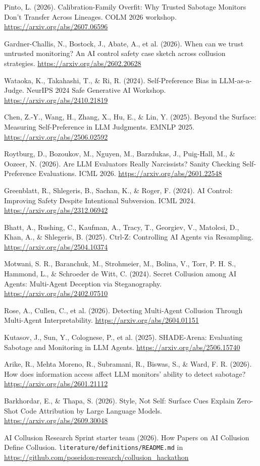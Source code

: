 \documentclass[11pt,letterpaper]{article}
\begin{document}
\begin{enumerate}[label={[\arabic*]},leftmargin=2.2em,itemsep=1pt]
\item Pinto, L. (2026). Calibration-Family Overfit: Why Trusted Sabotage Monitors Don't Transfer Across Lineages. COLM 2026 workshop. \url{https://arxiv.org/abs/2607.06596}
\item Gardner-Challis, N., Bostock, J., Abate, A., et al. (2026). When can we trust untrusted monitoring? An AI control safety case sketch across collusion strategies. \url{https://arxiv.org/abs/2602.20628}
\item Wataoka, K., Takahashi, T., \& Ri, R. (2024). Self-Preference Bias in LLM-as-a-Judge. NeurIPS 2024 Safe Generative AI Workshop. \url{https://arxiv.org/abs/2410.21819}
\item Chen, Z.-Y., Wang, H., Zhang, X., Hu, E., \& Lin, Y. (2025). Beyond the Surface: Measuring Self-Preference in LLM Judgments. EMNLP 2025. \url{https://arxiv.org/abs/2506.02592}
\item Roytburg, D., Bozoukov, M., Nguyen, M., Barzdukas, J., Puig-Hall, M., \& Oozeer, N. (2026). Are LLM Evaluators Really Narcissists? Sanity Checking Self-Preference Evaluations. ICML 2026. \url{https://arxiv.org/abs/2601.22548}
\item Greenblatt, R., Shlegeris, B., Sachan, K., \& Roger, F. (2024). AI Control: Improving Safety Despite Intentional Subversion. ICML 2024. \url{https://arxiv.org/abs/2312.06942}
\item Bhatt, A., Rushing, C., Kaufman, A., Tracy, T., Georgiev, V., Matolcsi, D., Khan, A., \& Shlegeris, B. (2025). Ctrl-Z: Controlling AI Agents via Resampling. \url{https://arxiv.org/abs/2504.10374}
\item Motwani, S. R., Baranchuk, M., Strohmeier, M., Bolina, V., Torr, P. H. S., Hammond, L., \& Schroeder de Witt, C. (2024). Secret Collusion among AI Agents: Multi-Agent Deception via Steganography. \url{https://arxiv.org/abs/2402.07510}
\item Rose, A., Cullen, C., et al. (2026). Detecting Multi-Agent Collusion Through Multi-Agent Interpretability. \url{https://arxiv.org/abs/2604.01151}
\item Kutasov, J., Sun, Y., Colognese, P., et al. (2025). SHADE-Arena: Evaluating Sabotage and Monitoring in LLM Agents. \url{https://arxiv.org/abs/2506.15740}
\item Arike, R., Mehta Moreno, R., Subramani, R., Biswas, S., \& Ward, F. R. (2026). How does information access affect LLM monitors' ability to detect sabotage? \url{https://arxiv.org/abs/2601.21112}
\item Barkhordar, E., \& Thapa, S. (2026). Style, Not Self: Surface Cues Explain Zero-Shot Code Attribution by Large Language Models. \url{https://arxiv.org/abs/2609.30048}
\item AI Collusion Research Sprint starter team (2026). How Papers on AI Collusion Define Collusion. \texttt{literature/definitions/README.md} in \url{https://github.com/poseidon-research/collusion_hackathon}
\end{enumerate}
\normalsize
\end{document}
